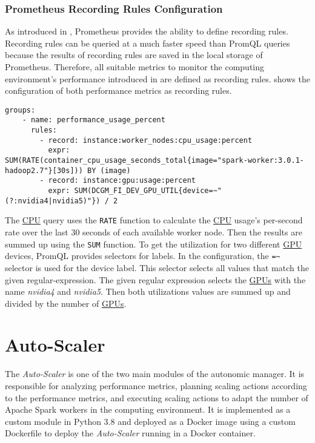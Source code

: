 \subsubsection{Prometheus Recording Rules Configuration}
%
As introduced in , Prometheus provides the ability to define recording rules. Recording rules can be queried at a much faster speed than PromQL queries because the results of recording rules are saved in the local storage of Prometheus.
%
Therefore, all suitable metrics to monitor the computing environment's performance introduced in  are defined as recording rules.
%
 shows the configuration of both performance metrics as recording rules.
%
\begin{lstlisting}[label=lst:06_env_depl_am_prom-rules, caption=Prometheus target configuration in YAML syntax]
groups:
    - name: performance_usage_percent
      rules:
        - record: instance:worker_nodes:cpu_usage:percent
          expr: SUM(RATE(container_cpu_usage_seconds_total{image="spark-worker:3.0.1-hadoop2.7"}[30s])) BY (image)
        - record: instance:gpu:usage:percent
          expr: SUM(DCGM_FI_DEV_GPU_UTIL{device=~"(?:nvidia4|nvidia5)"}) / 2
\end{lstlisting}
The \hyperlink{abbr:cpu}{CPU} query uses the \texttt{RATE} function to calculate the \hyperlink{abbr:cpu}{CPU} usage's per-second rate over the last 30 seconds of each available worker node. Then the results are summed up using the \texttt{SUM} function.
To get the utilization for two different \hyperlink{abbr:gpu}{GPU} devices, PromQL provides selectors for labels. In the configuration, the \texttt{=\~} selector is used for the device label. This selector selects all values that match the given regular-expression. The given regular expression selects the \hyperlink{abbr:gpu}{GPUs} with the name \textit{nvidia4} and \textit{nvidia5}. Then both utilizations values are summed up and divided by the number of \hyperlink{abbr:gpu}{GPUs}.


\section{Auto-Scaler}
The \textit{Auto-Scaler} is one of the two main modules of the autonomic manager. It is responsible for analyzing performance metrics, planning scaling actions according to the performance metrics, and executing scaling actions to adapt the number of Apache Spark workers in the computing environment.
It is implemented as a custom module in Python 3.8 and deployed as a Docker image using a custom Dockerfile to deploy the \textit{Auto-Scaler} running in a Docker container.


